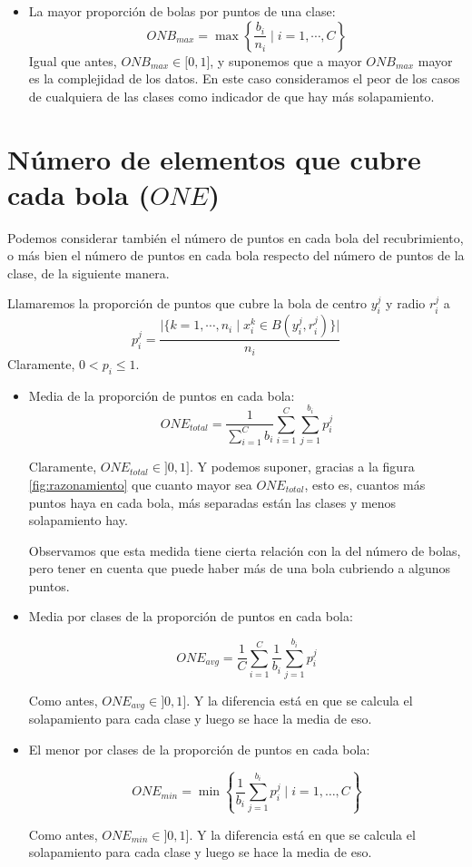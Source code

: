 \documentclass[a4paper,12pt]{report}
\theoremstyle{definition}
\begin{document}
\begin{itemize}
\item La mayor proporción de bolas por puntos de una clase:
  $$ ONB_{max} = \max \left\lbrace \frac{b_i}{n_i} \mid i=1, \cdots, C\right\rbrace$$
  Igual que antes, $ONB_{max} \in \lbrack 0, 1 \rbrack$, y suponemos que a mayor $ONB_{max}$ mayor es la complejidad de los datos. En este caso consideramos el peor de los casos de cualquiera de las clases como indicador de que hay más solapamiento.

\end{itemize}

\section{Número de elementos que cubre cada bola ($ONE$)}
\label{sec:one}

Podemos considerar también el número de puntos en cada bola del recubrimiento, o más bien el número de puntos en cada bola respecto del número de puntos de la clase, de la siguiente manera.

Llamaremos la proporción de puntos que cubre la bola de centro $y_i^j$ y radio $r_i^j$ a
$$p_i^j = \frac{\lvert \lbrace k=1, \cdots, n_i \mid x_i^k \in B(y_i^j, r_i^j) \rbrace \rvert}{n_i}$$
Claramente, $0 < p_i \leq 1$.

\begin{itemize}
\item Media de la proporción de puntos en cada bola:
  $$ ONE_{total} = \frac{1}{\sum_{i=1}^C b_i} \sum_{i=1}^C \sum_{j=1}^{b_i} p_i^j$$

  Claramente, $ONE_{total} \in \rbrack 0,1 \rbrack$. Y podemos suponer, gracias a la figura \ref{fig:razonamiento} que cuanto mayor sea $ONE_{total}$, esto es, cuantos más puntos haya en cada bola, más separadas están las clases y menos solapamiento hay.

  Observamos que esta medida tiene cierta relación con la del número de bolas, pero tener en cuenta que puede haber más de una bola cubriendo a algunos puntos.

\item Media por clases de la proporción de puntos en cada bola:

  $$ ONE_{avg} = \frac{1}{C} \sum_{i=1}^C \frac{1}{b_i}\sum_{j=1}^{b_i} p_i^j$$

  Como antes, $ONE_{avg} \in \rbrack 0,1 \rbrack$. Y la diferencia está en que se calcula el solapamiento para cada clase y luego se hace la media de eso.

\item El menor por clases de la proporción de puntos en cada bola:

  $$ ONE_{min} = \min \left\lbrace \frac{1}{b_i}\sum_{j=1}^{b_i} p_i^j \mid i=1, \ldots, C \right\rbrace $$

  Como antes, $ONE_{min} \in \rbrack 0,1 \rbrack$. Y la diferencia está en que se calcula el solapamiento para cada clase y luego se hace la media de eso.
\end{itemize}
\end{document}

